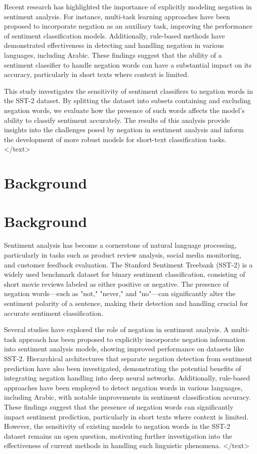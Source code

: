 \documentclass{article}
\begin{document}
Recent research has highlighted the importance of explicitly modeling negation in sentiment analysis. For instance, multi-task learning approaches have been proposed to incorporate negation as an auxiliary task, improving the performance of sentiment classification models. Additionally, rule-based methods have demonstrated effectiveness in detecting and handling negation in various languages, including Arabic. These findings suggest that the ability of a sentiment classifier to handle negation words can have a substantial impact on its accuracy, particularly in short texts where context is limited.

This study investigates the sensitivity of sentiment classifiers to negation words in the SST-2 dataset. By splitting the dataset into subsets containing and excluding negation words, we evaluate how the presence of such words affects the model's ability to classify sentiment accurately. The results of this analysis provide insights into the challenges posed by negation in sentiment analysis and inform the development of more robust models for short-text classification tasks.
</text>
\section{Background}
\section*{Background}

Sentiment analysis has become a cornerstone of natural language processing, particularly in tasks such as product review analysis, social media monitoring, and customer feedback evaluation. The Stanford Sentiment Treebank (SST-2) is a widely used benchmark dataset for binary sentiment classification, consisting of short movie reviews labeled as either positive or negative. The presence of negation words—such as "not," "never," and "no"—can significantly alter the sentiment polarity of a sentence, making their detection and handling crucial for accurate sentiment classification. 

Several studies have explored the role of negation in sentiment analysis. A multi-task approach has been proposed to explicitly incorporate negation information into sentiment analysis models, showing improved performance on datasets like SST-2. Hierarchical architectures that separate negation detection from sentiment prediction have also been investigated, demonstrating the potential benefits of integrating negation handling into deep neural networks. Additionally, rule-based approaches have been employed to detect negation words in various languages, including Arabic, with notable improvements in sentiment classification accuracy. These findings suggest that the presence of negation words can significantly impact sentiment prediction, particularly in short texts where context is limited. However, the sensitivity of existing models to negation words in the SST-2 dataset remains an open question, motivating further investigation into the effectiveness of current methods in handling such linguistic phenomena.
</text>
\end{document}
